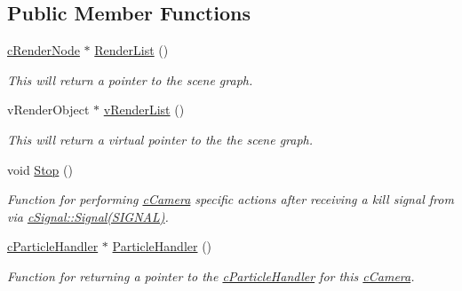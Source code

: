 \subsection*{Public Member Functions}
\begin{DoxyCompactItemize}
\item 
\hypertarget{classc_camera_a9f2dcf74c52d7d3d0f4199b9e0d491c6}{
\hyperlink{classc_render_node}{cRenderNode} $\ast$ \hyperlink{classc_camera_a9f2dcf74c52d7d3d0f4199b9e0d491c6}{RenderList} ()}
\label{classc_camera_a9f2dcf74c52d7d3d0f4199b9e0d491c6}

\begin{DoxyCompactList}\small\item\em This will return a pointer to the scene graph. \end{DoxyCompactList}\item 
\hypertarget{classc_camera_ac63b2c284eee4b9b7182d85390279336}{
vRenderObject $\ast$ \hyperlink{classc_camera_ac63b2c284eee4b9b7182d85390279336}{vRenderList} ()}
\label{classc_camera_ac63b2c284eee4b9b7182d85390279336}

\begin{DoxyCompactList}\small\item\em This will return a virtual pointer to the the scene graph. \end{DoxyCompactList}\item 
\hypertarget{classc_camera_a6701644b2d73e607cee85dbc866ba6d9}{
void \hyperlink{classc_camera_a6701644b2d73e607cee85dbc866ba6d9}{Stop} ()}
\label{classc_camera_a6701644b2d73e607cee85dbc866ba6d9}

\begin{DoxyCompactList}\small\item\em Function for performing \hyperlink{classc_camera}{cCamera} specific actions after receiving a kill signal from via \hyperlink{classc_signal_a545074be1da41d00050bed3cd2fb2305}{cSignal::Signal(SIGNAL)}. \end{DoxyCompactList}\item 
\hypertarget{classc_camera_ab798297d6aa91192e45f7910da1e0f9b}{
\hyperlink{classc_particle_handler}{cParticleHandler} $\ast$ \hyperlink{classc_camera_ab798297d6aa91192e45f7910da1e0f9b}{ParticleHandler} ()}
\label{classc_camera_ab798297d6aa91192e45f7910da1e0f9b}

\begin{DoxyCompactList}\small\item\em Function for returning a pointer to the \hyperlink{classc_particle_handler}{cParticleHandler} for this \hyperlink{classc_camera}{cCamera}. \end{DoxyCompactList}\end{DoxyCompactItemize}
